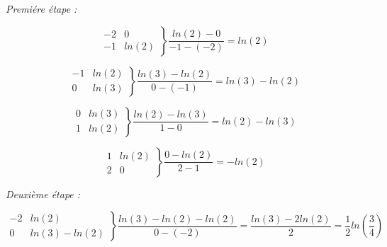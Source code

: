 \documentclass[12pt, letterpaper]{article}
\begin{document}
\begin{enumerate}
  \textit{Premiére étape :}

  \begin{equation*}
    \left.
    \begin{array}{ll}
       
      -2 & 0 \\
      -1 & ln(2)
    \end{array}
    \right\}
    \frac{ln(2) - 0}{-1 - (-2)} = ln(2)
  \end{equation*}

  \begin{equation*}
    \left.
    \begin{array}{ll}
       
      -1 & ln(2) \\
      0 & ln(3)
    \end{array}
    \right\}
    \frac{ln(3)- ln(2)}{0 - (-1)} = ln(3) - ln(2)
  \end{equation*}

  \begin{equation*}
    \left.
    \begin{array}{ll}
       
      0 & ln(3) \\
      1 & ln(2)
    \end{array}
    \right\}
    \frac{ln(2) - ln(3)}{1 - 0} = ln(2) - ln(3)
  \end{equation*}

  \begin{equation*}
    \left.
    \begin{array}{ll}
       
      1 & ln(2) \\
      2 & 0
    \end{array}
    \right\}
    \frac{0 - ln(2)}{2 - 1} = - ln(2)
  \end{equation*}

  \textit{Deuxième étape :}

  \begin{equation*}
    \left.
    \begin{array}{ll}
       
      -2 & ln(2) \\
      0 & ln(3) - ln(2)
    \end{array}
    \right\}
    \frac{ln(3) - ln(2) - ln(2)}{0 - (-2)} = \frac{ln(3) - 2ln(2)}{2}
    = \frac{1}{2} ln(\frac{3}{4})
  \end{equation*}
  
  \begin{equation*}
    \left.
    \begin{array}{ll}
       

\end{array}
\end{equation*}
\end{enumerate}
\end{document}
